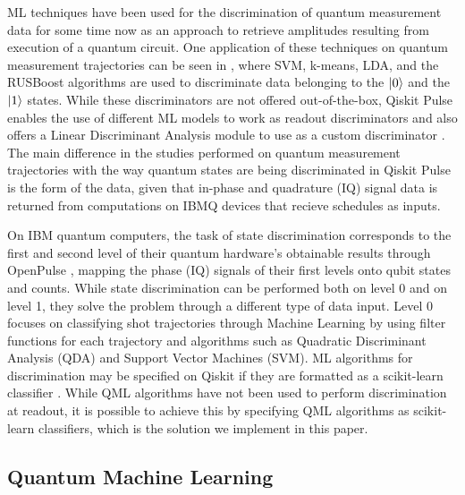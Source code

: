 \documentclass[conference]{IEEEtran}
\begin{document}
ML techniques have been used for the discrimination of quantum measurement data for some time now as an approach to retrieve amplitudes resulting from execution of a quantum circuit. One application of these techniques on quantum measurement trajectories can be seen in \cite{Magesan_2015}, where SVM, k-means, LDA, and the RUSBoost algorithms are used to discriminate data belonging to the \(\ket{0}\) and the \(\ket{1}\) states. While these discriminators are not offered out-of-the-box, Qiskit Pulse enables the use of different ML models to work as readout discriminators and also offers a Linear Discriminant Analysis module to use as a custom discriminator \cite{Alexander_2020}. The main difference in the studies performed on quantum measurement trajectories with the way quantum states are being discriminated in Qiskit Pulse is the form of the data, given that in-phase and quadrature (IQ) signal data is returned from computations on IBMQ devices that recieve schedules as inputs.

On IBM quantum computers, the task of state discrimination corresponds to the first and second level of their quantum hardware's obtainable results through OpenPulse \cite{mckay2018qiskit}, mapping the phase (IQ) signals of their first levels onto qubit states and counts. While state discrimination can be performed both on level 0 and on level 1, they solve the problem through a different type of data input. Level 0 focuses on classifying shot trajectories through Machine Learning by using filter functions for each trajectory \cite{doi:10.1063/1.4813269} and algorithms such as Quadratic Discriminant Analysis (QDA) and Support Vector Machines (SVM). ML algorithms for discrimination may be specified on Qiskit if they are formatted as a scikit-learn classifier \cite{sklearn_api}. While QML algorithms have not been used to perform discrimination at readout, it is possible to achieve this by specifying QML algorithms as scikit-learn classifiers, which is the solution we implement in this paper.

\subsection{Quantum Machine Learning}
\end{document}
